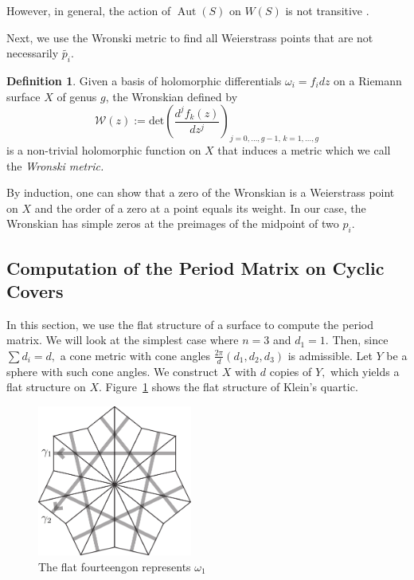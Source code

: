 \documentclass[12pt,reqno]{amsart}
\DeclareMathOperator{\Aut}{Aut}
\theoremstyle{definition}
\newtheorem{defn}{Definition}
\theoremstyle{remark}
\begin{document}
However, in general, the action of $\Aut(S)$ on $W(S)$ is not transitive \cite{ls}. 

Next, we use the Wronski metric to find all Weierstrass points that are not necessarily $\widetilde{p_i}.$

\begin{defn}\label{def: wronski} Given a basis of holomorphic differentials $\omega_i = f_i d z$ on a Riemann surface $X$ of genus $g$, the Wronskian defined by $$\mathcal{W}(z) := \textrm{det} \left( \frac{d^j f_k(z)}{d z^j} \right)_{j = 0, \ldots , g - 1, \, k = 1, \ldots , g}$$ is a non-trivial holomorphic function on $X$ that induces a metric which we call the \textit{Wronski metric.} \end{defn}

By induction, one can show that a zero of the Wronskian is a Weierstrass point on $X$ and the order of a zero at a point equals its weight. In our case, the Wronskian has simple zeros at the preimages of the midpoint of two $p_i.$

\subsection{Computation of the Period Matrix on Cyclic Covers}
\label{sec:cyclicperiod}
In this section, we use the flat structure of a surface to compute the period matrix. We will look at the simplest case where $n = 3$ and $d_1 = 1.$ Then, since $\sum d_i = d,$ a cone metric with cone angles $\frac{2 \pi}{d}(d_1, d_2, d_3)$ is admissible. Let $Y$ be a sphere with such cone angles. We construct $X$ with $d$ copies of $Y,$ which yields a flat structure on $X.$ Figure~\ref{fig: 124_flat} shows the flat structure of Klein's quartic.  

\begin{figure}[htbp] %
   \centering
   \includegraphics[width=2in]{figures/124_flat} 
	\caption{The flat fourteengon represents $\omega_1$}
	\label{fig: 124_flat}
\end{figure}
\end{document}
